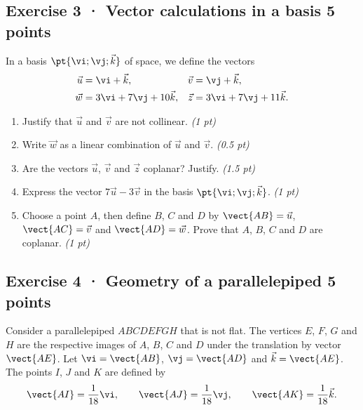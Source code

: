 \mxnewpage{}

\subsection*{Exercise 3 · Vector calculations in a basis \hfill 5 points}In a basis $\pt{\vi;\vj;\vec k}$ of space, we define the vectors
\[\begin{aligned}\vec u&=\vi+\vec k,&\vec v&=\vj+\vec k,\\
\vec w&=3\vi+7\vj+10\vec k,&\vec z&=3\vi+7\vj+11\vec k.\end{aligned}\]

\begin{enumerate}

\item Justify that $\vec u$ and $\vec v$ are not collinear. \hfill\textit{(1 pt)}

\item Write $\vec w$ as a linear combination of $\vec u$ and $\vec v$. \hfill\textit{(0.5 pt)}

\item Are the vectors $\vec u$, $\vec v$ and $\vec z$ coplanar? Justify. \hfill\textit{(1.5 pt)}

\item Express the vector $7\vec u-3\vec v$ in the basis $\pt{\vi;\vj;\vec k}$. \hfill\textit{(1 pt)}

\item Choose a point $A$, then define $B$, $C$ and $D$ by $\vect{AB}=\vec u$, $\vect{AC}=\vec v$ and $\vect{AD}=\vec w$. Prove that $A$, $B$, $C$ and $D$ are coplanar. \hfill\textit{(1 pt)}

\end{enumerate}

\subsection*{Exercise 4 · Geometry of a parallelepiped \hfill 5 points}Consider a parallelepiped $ABCDEFGH$ that is not flat. The vertices $E$, $F$, $G$ and $H$ are the respective images of $A$, $B$, $C$ and $D$ under the translation by vector $\vect{AE}$.
Let $\vi=\vect{AB}$, $\vj=\vect{AD}$ and $\vec k=\vect{AE}$.
The points $I$, $J$ and $K$ are defined by
\[\vect{AI}=\frac1{18}\vi,\qquad\vect{AJ}=\frac1{18}\vj,\qquad\vect{AK}=\frac1{18}\vec k.\]

